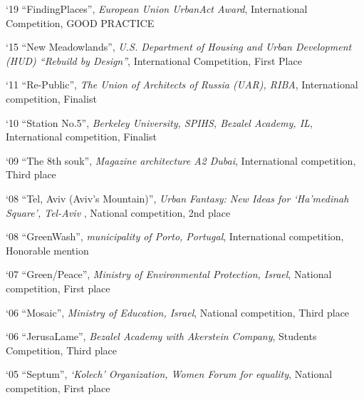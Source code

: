 \begin{tablist}

	\item[`19]\tab \enquote{FindingPlaces},
	\textit{European Union UrbanAct Award},
	International Competition,
	GOOD PRACTICE


	\item[`15]\tab \enquote{New Meadowlands},
	\textit{U.S. Department of Housing and Urban Development (HUD) “Rebuild by Design”},
	International Competition,
	First Place


	\item[`11]\tab \enquote{Re-Public},
	\textit{The Union of Architects of Russia (UAR), RIBA},
	International competition,
	Finalist


	\item[`10]\tab \enquote{Station No.5},
	\textit{Berkeley University, SPIHS, Bezalel Academy, IL},
	International competition,
	Finalist


	\item[`09]\tab \enquote{The 8th souk},
	\textit{Magazine architecture A2 Dubai},
	International competition,
	Third place


	\item[`08]\tab \enquote{Tel, Aviv (Aviv’s Mountain)},
	\textit{Urban Fantasy: New Ideas for ‘Ha’medinah Square’, Tel-Aviv },
	National competition,
	2nd place


	\item[`08]\tab \enquote{GreenWash},
	\textit{municipality of Porto, Portugal},
	International competition,
	Honorable mention


	\item[`07]\tab \enquote{Green/Peace},
	\textit{Ministry of Environmental Protection, Israel},
	National competition,
	First place


	\item[`06]\tab \enquote{Mosaic},
	\textit{Ministry of Education, Israel},
	National competition,
	Third place


	\item[`06]\tab \enquote{JerusaLame},
	\textit{Bezalel Academy with Akerstein Company},
	Students Competition,
	Third place


	\item[`05]\tab \enquote{Septum},
	\textit{‘Kolech’ Organization, Women Forum for equality},
	National competition,
	First place


\end{tablist}



